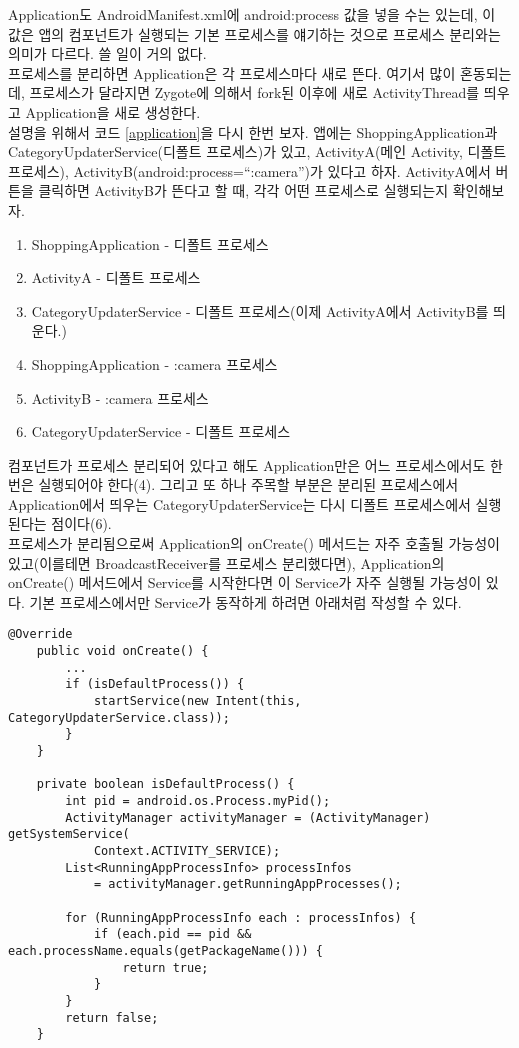 Application도 AndroidManifest.xml에 android:process 값을 넣을 수는 있는데, 이 값은 앱의 컴포넌트가 실행되는 기본 프로세스를 얘기하는 것으로 프로세스 분리와는 의미가 다르다. 쓸 일이 거의 없다.\\

프로세스를 분리하면 Application은 각 프로세스마다 새로 뜬다. 여기서 많이 혼동되는데, 프로세스가 달라지면 Zygote에 의해서 fork된 이후에 새로 ActivityThread를 띄우고 Application을 새로 생성한다.\\

설명을 위해서 코드 \ref{application}을 다시 한번 보자. 앱에는 ShoppingApplication과 CategoryUpdaterService(디폴트 프로세스)가 있고, ActivityA(메인 Activity, 디폴트 프로세스), ActivityB(android:process=``:camera'')가 있다고 하자. 
ActivityA에서 버튼을 클릭하면 ActivityB가 뜬다고 할 때, 각각 어떤 프로세스로 실행되는지 확인해보자.

\begin{enumerate}
\item ShoppingApplication - 디폴트 프로세스
\item ActivityA - 디폴트 프로세스
\item CategoryUpdaterService - 디폴트 프로세스(이제 ActivityA에서 ActivityB를 띄운다.)
\item ShoppingApplication - :camera 프로세스
\item ActivityB - :camera 프로세스
\item CategoryUpdaterService - 디폴트 프로세스
\end{enumerate}

컴포넌트가 프로세스 분리되어 있다고 해도 Application만은 어느 프로세스에서도 한번은 실행되어야 한다(4).
그리고 또 하나 주목할 부분은 분리된 프로세스에서 Application에서 띄우는 CategoryUpdaterService는 다시 디폴트 프로세스에서 실행된다는 점이다(6).\\

프로세스가 분리됨으로써 Application의 onCreate() 메서드는 자주 호출될 가능성이 있고(이를테면 BroadcastReceiver를 프로세스 분리했다면), Application의 onCreate() 메서드에서 Service를 시작한다면 이 Service가 자주 실행될 가능성이 있다.
기본 프로세스에서만 Service가 동작하게 하려면 아래처럼 작성할 수 있다.

\begin{lstlisting}[frame=single] 
	@Override
	public void onCreate() {
		...
		if (isDefaultProcess()) {
			startService(new Intent(this, CategoryUpdaterService.class));
		}
	}
	
	private boolean isDefaultProcess() {
		int pid = android.os.Process.myPid();
        ActivityManager activityManager = (ActivityManager) getSystemService(
        	Context.ACTIVITY_SERVICE);                      
        List<RunningAppProcessInfo> processInfos 
        	= activityManager.getRunningAppProcesses();     

        for (RunningAppProcessInfo each : processInfos) {                          
            if (each.pid == pid && each.processName.equals(getPackageName())) {                              
                return true;
            }                         
        }
        return false;
    }
\end{lstlisting}

